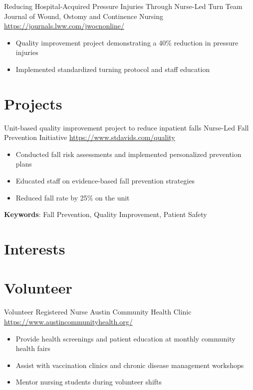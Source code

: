 \documentclass[a4paper, serif, 10pt]{moderncv}
\begin{document}
        {Reducing Hospital-Acquired Pressure Injuries Through Nurse-Led Turn Team}
        {Journal of Wound, Ostomy and Continence Nursing}
        {\url{https://journals.lww.com/jwocnonline/}}
        {}
        {\begin{itemize}
\item Quality improvement project demonstrating a 40\% reduction in pressure injuries
\item Implemented standardized turning protocol and staff education
\end{itemize}}
\section{Projects}

        {Unit-based quality improvement project to reduce inpatient falls}
        {Nurse-Led Fall Prevention Initiative}
        {\url{https://www.stdavids.com/quality}}
        {}
        {\begin{itemize}
\item Conducted fall risk assessments and implemented personalized prevention plans
\item Educated staff on evidence-based fall prevention strategies
\item Reduced fall rate by 25\% on the unit
\end{itemize}
\textbf{Keywords}: Fall Prevention, Quality Improvement, Patient Safety}
\section{Interests}

\section{Volunteer}

        {Volunteer Registered Nurse}
        {Austin Community Health Clinic}
        {\url{https://www.austincommunityhealth.org/}}
        {}
        {\begin{itemize}
\item Provide health screenings and patient education at monthly community health fairs
\item Assist with vaccination clinics and chronic disease management workshops
\item Mentor nursing students during volunteer shifts
\end{itemize}}
    
\end{document}
